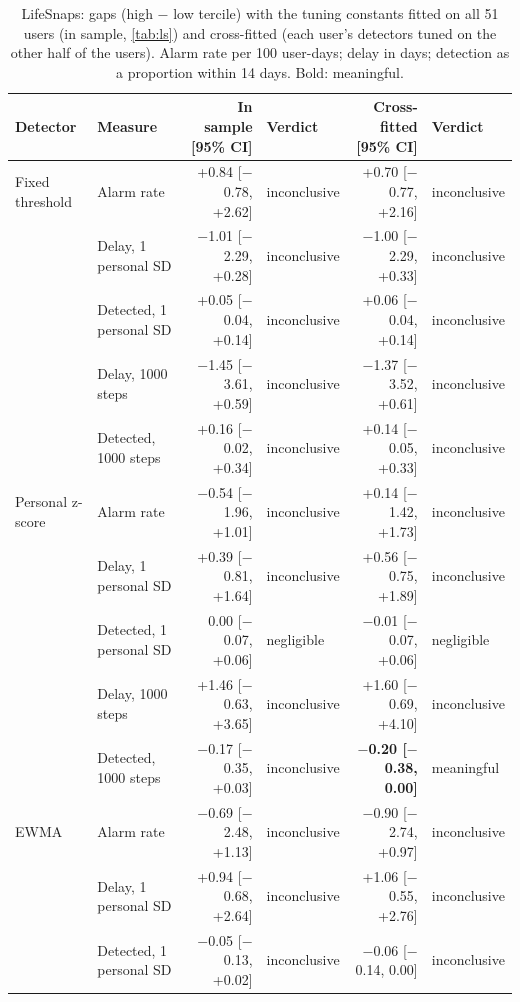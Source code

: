 \begin{table}[!htbp]
\centering
\scriptsize
\setlength{\tabcolsep}{3.0pt}
\caption{LifeSnaps: gaps (high $-$ low tercile) with the tuning constants fitted on all 51 users (in sample, \cref{tab:ls}) and cross-fitted (each user's detectors tuned on the other half of the users). Alarm rate per 100 user-days; delay in days; detection as a proportion within 14 days. Bold: meaningful.}
\label{tab:crossfit}
\begin{tabular}{@{}llrlrl@{}}
\toprule
Detector & Measure & In sample [95\% CI] & Verdict & Cross-fitted [95\% CI] & Verdict \\
\midrule
Fixed threshold & Alarm rate & +0.84 [$-$0.78, +2.62] & inconclusive & +0.70 [$-$0.77, +2.16] & inconclusive \\
 & Delay, 1 personal SD & $-$1.01 [$-$2.29, +0.28] & inconclusive & $-$1.00 [$-$2.29, +0.33] & inconclusive \\
 & Detected, 1 personal SD & +0.05 [$-$0.04, +0.14] & inconclusive & +0.06 [$-$0.04, +0.14] & inconclusive \\
 & Delay, 1000 steps & $-$1.45 [$-$3.61, +0.59] & inconclusive & $-$1.37 [$-$3.52, +0.61] & inconclusive \\
 & Detected, 1000 steps & +0.16 [$-$0.02, +0.34] & inconclusive & +0.14 [$-$0.05, +0.33] & inconclusive \\
\addlinespace
Personal z-score & Alarm rate & $-$0.54 [$-$1.96, +1.01] & inconclusive & +0.14 [$-$1.42, +1.73] & inconclusive \\
 & Delay, 1 personal SD & +0.39 [$-$0.81, +1.64] & inconclusive & +0.56 [$-$0.75, +1.89] & inconclusive \\
 & Detected, 1 personal SD & 0.00 [$-$0.07, +0.06] & negligible & $-$0.01 [$-$0.07, +0.06] & negligible \\
 & Delay, 1000 steps & +1.46 [$-$0.63, +3.65] & inconclusive & +1.60 [$-$0.69, +4.10] & inconclusive \\
 & Detected, 1000 steps & $-$0.17 [$-$0.35, +0.03] & inconclusive & \textbf{$-$0.20 [$-$0.38, 0.00]} & meaningful \\
\addlinespace
EWMA & Alarm rate & $-$0.69 [$-$2.48, +1.13] & inconclusive & $-$0.90 [$-$2.74, +0.97] & inconclusive \\
 & Delay, 1 personal SD & +0.94 [$-$0.68, +2.64] & inconclusive & +1.06 [$-$0.55, +2.76] & inconclusive \\
 & Detected, 1 personal SD & $-$0.05 [$-$0.13, +0.02] & inconclusive & $-$0.06 [$-$0.14, 0.00] & inconclusive \\

\end{tabular}
\end{table}

